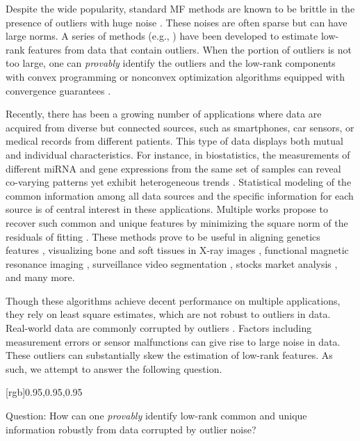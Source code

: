 \documentclass[twoside,11pt]{article}
\begin{document}
Despite the wide popularity, standard MF methods are known to be brittle in the presence of outliers with huge noise \citep{robustpca}. These noises are often sparse but can have large norms.
 A series of methods (e.g., \citep{robustpca,nonconvexrobustpca,robustmatrixcompletion1, fattahi2020exact, chenfan}) have been developed to estimate low-rank features from data that contain outliers. When the portion of outliers is not too large, one can \textit{provably} identify the outliers and the low-rank components with convex programming \citep{robustpca} or nonconvex optimization algorithms equipped with convergence guarantees \citep{nonconvexrobustpca}.

Recently, there has been a growing number of applications where data are acquired from diverse but connected sources, such as smartphones, car sensors, or medical records from different patients. This type of data displays both mutual and individual characteristics. For instance, in biostatistics, the measurements of different miRNA and gene expressions from the same set of samples can reveal co-varying patterns yet exhibit heterogeneous trends \citep{jive}. Statistical modeling of the common information among all data sources and the specific information for each source is of central interest in these applications. Multiple works propose to recover such common and unique features by minimizing the square norm of the residuals of fitting \citep{jive,cobe, slide,bidifac, groupnmf,inmf, personalizedpca, hmf,perdl}. These methods prove to be useful in aligning genetics features \citep{jive}, visualizing bone and soft tissues in X-ray images \citep{cobe}, functional magnetic resonance imaging \citep{fmri}, surveillance video segmentation \citep{personalizedpca}, stocks market analysis \citep{hmf}, and many more.

Though these algorithms achieve decent performance on multiple applications, they rely on least square estimates, which are not robust to outliers in data. Real-world data are commonly corrupted by outliers \citep{sensornoise}. Factors including measurement errors or sensor malfunctions can give rise to large noise in data. These outliers can substantially skew the estimation of low-rank features. As such, we attempt to answer the following question.

\begin{center}
    \noindent{}[rgb]{0.95,0.95,0.95}{\begin{minipage}{0.98\columnwidth}
	\begin{center}
Question: How can one \textit{provably} identify low-rank common and unique information robustly from data corrupted by outlier noise?
\end{center}
\end{minipage}}
\end{center}
\end{document}
